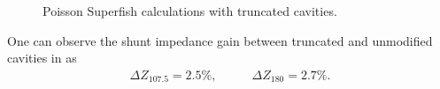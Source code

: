 \documentclass{article}
\begin{document}
\begin{figure}[H]
    \centering
    \vspace{5pt}
    \vspace{5pt}
    \caption{\centering Poisson Superfish calculations with truncated cavities.} 
    \label{fig:180_cavity_shunt_diff}
\end{figure}

\vspace{-10pt}
One can observe the shunt impedance gain between truncated and unmodified cavities in  as
\vspace{-22pt}\begin{equation}
    \begin{aligned}
        \Delta Z_{107.5}=2.5\%   ,
    \end{aligned}
    \qquad
    \begin{aligned}
        \Delta Z_{180}=2.7\% .
    \end{aligned}
\end{equation}

\end{document}
